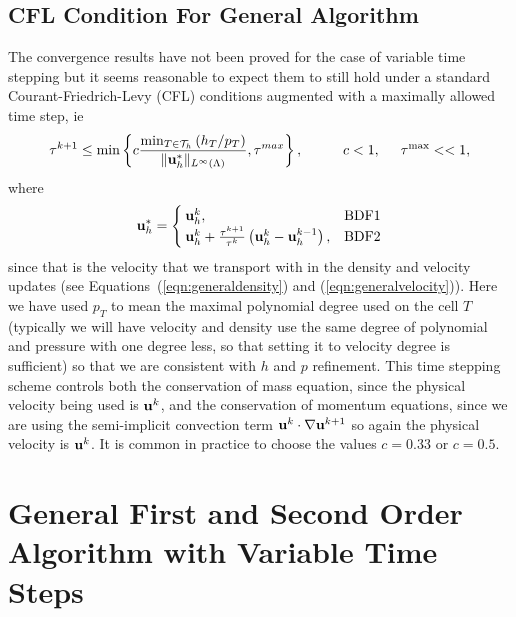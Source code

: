 \documentclass[letterpaper]{erdc}
\begin{document}
\subsection{CFL Condition For General Algorithm}\label{sec:CFLgeneralalgorithm}
The convergence results have not been proved for the case of variable time stepping but it seems reasonable to expect them to still hold under a standard Courant-Friedrich-Levy (CFL) conditions augmented with a maximally allowed time step, ie
\begin{equation}
  \tau^{k+1} \leq \min \left\{c \frac{\min_{T\in\mathcal{T}_h}\left(h_{T}/p_T\right)}{\|\textbf{u}_h^{*}\|_{L^{\infty}(\Lambda)}}, \tau^{max}\right\}, \hspace{1cm} c<1, \hspace{0.5cm}\tau^{\max} << 1,
\end{equation}
where 
\begin{equation}
  \ub_h^{*} = \begin{cases} \ub_h^{k}, & \mbox{BDF1}\\ \ub_h^{k}+ \frac{\tau^{k+1}}{\tau^{k}}\left(\ub_h^{k} - \ub_h^{k-1}\right),& $\mbox{BDF2}$ \end{cases}
\end{equation}
since that is the velocity that we transport with in the density and velocity updates (see Equations~(\ref{eqn:generaldensity}) and (\ref{eqn:generalvelocity})).
Here we have used $p_T$ to mean the maximal polynomial degree used on the cell $T$ (typically we will have velocity and density use the same degree of polynomial and pressure with one degree less, so that setting it to velocity degree is sufficient) so that we are consistent with $h$ and $p$ refinement.  This time stepping scheme controls both the conservation of mass equation, since the physical velocity being used is $\textbf{u}^{k}$, and the conservation of momentum equations, since we are using the semi-implicit convection term $\textbf{u}^{k}\cdot\nabla\textbf{u}^{k+1}$ so again the physical velocity is $\textbf{u}^{k}$.  It is common in practice to choose the values $c=0.33$ or $c=0.5$.




%
%
%
\section{General First and Second Order Algorithm with Variable Time Steps}\label{sec:generalalgorithm}
\end{document}
